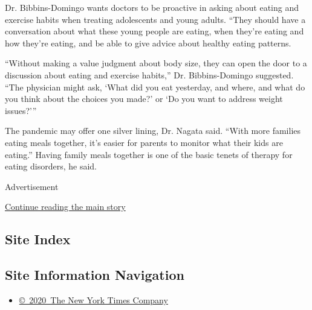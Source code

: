 Dr. Bibbins-Domingo wants doctors to be proactive in asking about eating
and exercise habits when treating adolescents and young adults. ``They
should have a conversation about what these young people are eating,
when they're eating and how they're eating, and be able to give advice
about healthy eating patterns.

``Without making a value judgment about body size, they can open the
door to a discussion about eating and exercise habits,'' Dr.
Bibbins-Domingo suggested. ``The physician might ask, `What did you eat
yesterday, and where, and what do you think about the choices you made?'
or `Do you want to address weight issues?'''

The pandemic may offer one silver lining, Dr. Nagata said. ``With more
families eating meals together, it's easier for parents to monitor what
their kids are eating.'' Having family meals together is one of the
basic tenets of therapy for eating disorders, he said.

Advertisement

\protect\hyperlink{after-bottom}{Continue reading the main story}

\hypertarget{site-index}{%
\subsection{Site Index}\label{site-index}}

\hypertarget{site-information-navigation}{%
\subsection{Site Information
Navigation}\label{site-information-navigation}}

\begin{itemize}
\tightlist
\item
  \href{https://help.nytimes.com/hc/en-us/articles/115014792127-Copyright-notice}{©~2020~The
  New York Times Company}
\end{itemize}

